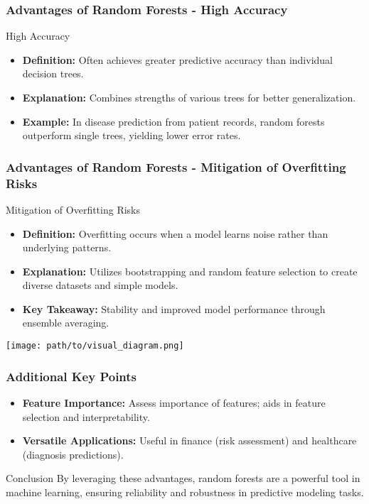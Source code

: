 \documentclass{beamer}
\begin{document}
\begin{frame}[fragile]
    \frametitle{Advantages of Random Forests - High Accuracy}
    \begin{block}{High Accuracy}
        \begin{itemize}
            \item \textbf{Definition:} Often achieves greater predictive accuracy than individual decision trees.
            \item \textbf{Explanation:} Combines strengths of various trees for better generalization.
            \item \textbf{Example:} In disease prediction from patient records, random forests outperform single trees, yielding lower error rates.
        \end{itemize}
    \end{block}
\end{frame}

\begin{frame}[fragile]
    \frametitle{Advantages of Random Forests - Mitigation of Overfitting Risks}
    \begin{block}{Mitigation of Overfitting Risks}
        \begin{itemize}
            \item \textbf{Definition:} Overfitting occurs when a model learns noise rather than underlying patterns.
            \item \textbf{Explanation:} Utilizes bootstrapping and random feature selection to create diverse datasets and simple models.
            \item \textbf{Key Takeaway:} Stability and improved model performance through ensemble averaging.
        \end{itemize}
    \end{block}
    \begin{center}
        \texttt{[image: path/to/visual\_diagram.png]}
    \end{center}
\end{frame}

\begin{frame}[fragile]
    \frametitle{Additional Key Points}
    \begin{itemize}
        \item \textbf{Feature Importance:} Assess importance of features; aids in feature selection and interpretability.
        \item \textbf{Versatile Applications:} Useful in finance (risk assessment) and healthcare (diagnosis predictions).
    \end{itemize}
    \begin{block}{Conclusion}
        By leveraging these advantages, random forests are a powerful tool in machine learning, ensuring reliability and robustness in predictive modeling tasks.
    \end{block}
\end{frame}
\end{document}
